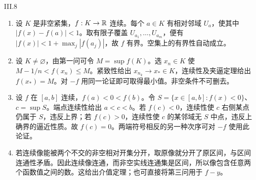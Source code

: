 \begin{solution}{III.8}
\begin{enumerate}
 \item 设 \(K\) 是非空紧集，\(f:K\to\mathbb{R}\) 连续。每个 \(a\in K\) 有相对邻域 \(U_a\)，使其中 \(|f(x)-f(a)|<1\)。取有限子覆盖 \(U_{a_1},\ldots,U_{a_m}\)，便有 \(|f(x)|<1+\max_j|f(a_j)|\)，故 \(f\) 有界。空集上的有界性自动成立。
 \item 设 \(K\ne\varnothing\)，由第一问可令 \(M=\sup f(K)\)。选 \(x_n\in K\) 使 \(M-1/n<f(x_n)\le M\)。紧致性给出 \(x_{n_k}\to x_*\in K\)，连续性及夹逼定理给出 \(f(x_*)=M\)。对 \(-f\) 用同一论证即可取得最小值。非空条件不可删去。
 \item 设 \(f\) 在 \([a,b]\) 连续，\(f(a)<0<f(b)\)。令 \(S=\{x\in[a,b]:f(x)<0\}\)、\(c=\sup S\)。端点连续性给出 \(a<c<b\)。若 \(f(c)<0\)，连续性使 \(c\) 右侧某点仍属于 \(S\)，违反上界；若 \(f(c)>0\)，连续性使 \(c\) 的某邻域无 \(S\) 中点，违反上确界的逼近性质。故 \(f(c)=0\)。两端符号相反的另一种次序可对 \(-f\) 使用此论证。
 \item 若连续像能被两个不交的非空相对开集分开，取原像就分开了原区间，与区间连通性矛盾。因此连续像连通，而非空实线连通集是区间，所以像包含任意两个函数值之间的数。这给出介值定理；也可直接将第三问用于 \(f-y\)。
\end{enumerate}
\end{solution}

